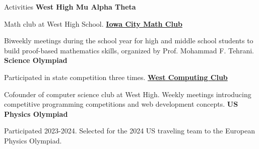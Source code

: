 \begin{rubric}{Activities}
\entry*[2019-present] \textbf{West High Mu Alpha Theta}
    \par Math club at West High School.
\entry*[2021-present] \textbf{\href{https://homepage.divms.uiowa.edu/~mftehrani/MathClub.html}{Iowa City Math Club}}
    \par Biweekly meetings during the school year for high and middle school students to build proof-based mathematics skills, organized by Prof. Mohammad F. Tehrani.
\entry*[2021-present] \textbf{Science Olympiad}
    \par Participated in state competition three times. 
\entry*[2023-present] \textbf{\href{https://west-computing-club.github.io}{West Computing Club}}
    \par Cofounder of computer science club at West High. Weekly meetings introducing competitive programming competitions and web development concepts.
\entry*[2024] \textbf{US Physics Olympiad}
    \par Participated 2023-2024. Selected for the 2024 US traveling team to the European Physics Olympiad.
\end{rubric}